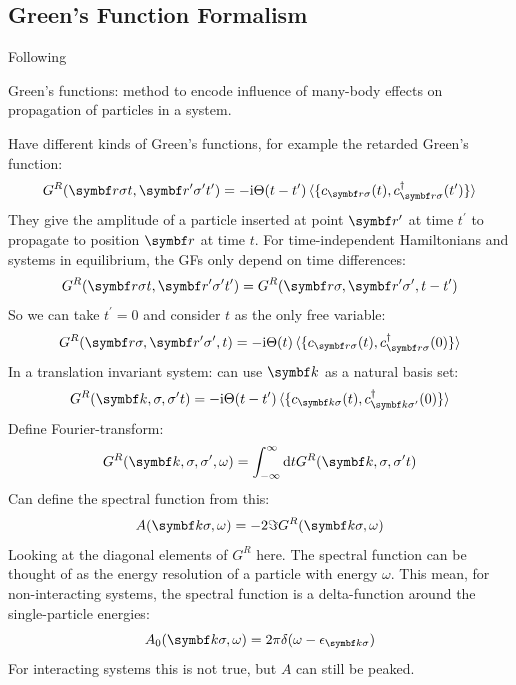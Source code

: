 \documentclass[../notes.tex]{subfiles}
\begin{document}
\subsection{Green's Function Formalism}



Following~\cite{bruusManyBodyQuantumTheory2004}


Green's functions: method to encode influence of many-body effects on propagation of particles in a system.

Have different kinds of Green's functions, for example the retarded Green's function:
\begin{equation}
	G^R (\vb{r}\sigma t, \vb{r}^{\prime} \sigma^{\prime} t^{\prime}) = -\iu \Theta(t- t^{\prime}) \braket{ \{c_{\vb{r} \sigma} (t), c_{\vb{r} \sigma}^{\dagger} (t^{\prime})\}}
\end{equation}
They give the amplitude of a particle inserted at point \(\vb{r}^{\prime}\) at time \(t^{\prime}\) to propagate to position \(\vb{r}\) at time \(t\).
For time-independent Hamiltonians and systems in equilibrium, the GFs only depend on time differences:
\begin{equation}
	G^R (\vb{r}\sigma t, \vb{r}^{\prime} \sigma^{\prime} t^{\prime}) = G^R (\vb{r} \sigma, \vb{r}^{\prime} \sigma^{\prime}, t - t^{\prime})
\end{equation}
So we can take \(t^{\prime} = 0\) and consider \(t\) as the only free variable:
\begin{equation}
	G^R (\vb{r}\sigma, \vb{r}^{\prime} \sigma^{\prime}, t) = -\iu \Theta(t) \braket{ \{c_{\vb{r} \sigma} (t), c_{\vb{r} \sigma}^{\dagger} (0)\}}
\end{equation}
In a translation invariant system: can use \(\vb{k}\) as a natural basis set:
\begin{equation}
	G^R (\vb{k}, \sigma, \sigma^{\prime} t) = -\iu \Theta(t- t^{\prime}) \braket{ \{c_{\vb{k} \sigma} (t), c_{\vb{k} \sigma^{\prime}}^{\dagger} (0)\}}
\end{equation}
Define Fourier-transform:
\begin{equation}
	G^R (\vb{k}, \sigma, \sigma^{\prime}, \omega) = \int_{-\infty}^{\infty} \odif{t} G^R (\vb{k}, \sigma, \sigma^{\prime} t)
\end{equation}
Can define the spectral function from this:
\begin{equation}
	A(\vb{k} \sigma, \omega) = -2 \Im G^R (\vb{k} \sigma, \omega)
\end{equation}
Looking at the diagonal elements of \(G^R\) here.
The spectral function can be thought of as the energy resolution of a particle with energy \(\omega\).
This mean, for non-interacting systems, the spectral function is a delta-function around the single-particle energies:
\begin{equation}
	A_0 (\vb{k} \sigma, \omega) = 2\pi \delta (\omega - \epsilon_{\vb{k} \sigma})
\end{equation}
For interacting systems this is not true, but \(A\) can still be peaked.
\end{document}
